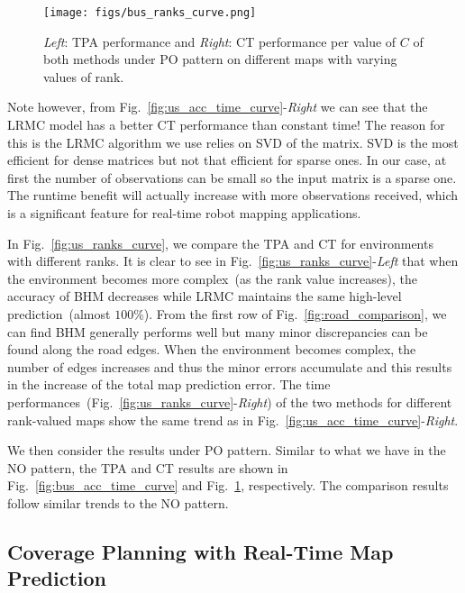 \begin{figure}%
  \centering
  	{\label{fig:bus_ranks_curve}\texttt{[image: figs/bus\_ranks\_curve.png]}}
  \caption{\small \textit{Left}: TPA performance and \textit{Right}: CT performance per value of $C$ of both methods under PO pattern on different maps with varying values of rank.
  } \vspace{-10pt}
\label{fig:bus_ranks_curve}  
\end{figure}

Note however, from Fig.~\ref{fig:us_acc_time_curve}-\textit{Right} we can see that the LRMC model has a better CT performance than constant time! The reason for this is the LRMC algorithm we use relies on SVD of the matrix. SVD is the most efficient for  dense matrices but not that efficient for sparse ones. In our case,   at first the number of observations can be small so the input matrix is a sparse one. 
The runtime benefit will actually  increase with more observations received, which is a significant feature for real-time robot mapping applications.  

In Fig.~\ref{fig:us_ranks_curve}, we compare the TPA and CT for environments with different ranks. It is clear to see in Fig.~\ref{fig:us_ranks_curve}-\textit{Left} that when the environment becomes more complex~(as the rank value increases), the accuracy of BHM decreases while LRMC maintains the same high-level prediction~(almost $100\%$). From the first row of Fig.~\ref{fig:road_comparison}, we can find BHM generally performs well but many minor discrepancies can be found along the road edges.  When the environment becomes complex, the number of edges increases and thus the minor errors accumulate and this results in the increase of the total map prediction error. The time performances~(Fig.~\ref{fig:us_ranks_curve}-\textit{Right}) of the two methods for different rank-valued maps show the same trend as in Fig.~\ref{fig:us_acc_time_curve}-\textit{Right}.

We then consider the results under PO pattern. Similar to what we have in the NO pattern, the TPA and CT results are shown in Fig.~\ref{fig:bus_acc_time_curve} and Fig.~\ref{fig:bus_ranks_curve}, respectively. The comparison results follow similar trends to the NO pattern. 

\subsection{Coverage Planning with Real-Time Map Prediction}

